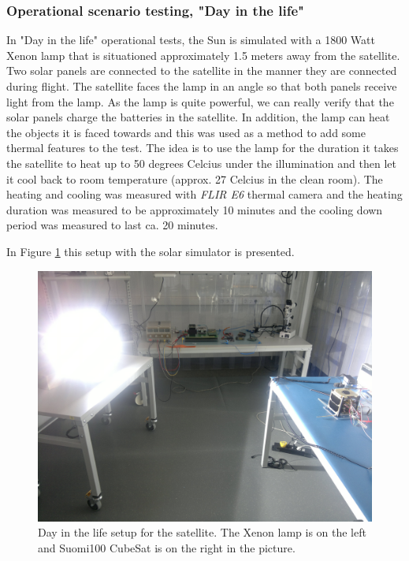 \documentclass[english,12pt,a4paper,pdftex,elec,utf8]{aaltothesis}
\begin{document}
\subsubsection{Operational scenario testing, "Day in the life"}
In "Day in the life" operational tests, the Sun is simulated with a %
1800 Watt Xenon lamp that is situationed approximately 1.5 meters away from the satellite. Two solar panels are connected to the satellite in the manner they are connected during flight. The satellite faces the lamp in an angle so that both panels receive light from the lamp. As the lamp is quite powerful, we can really verify that the solar panels charge the batteries in the satellite. In addition, the lamp can heat the objects it is faced towards and this was used as a method to add some thermal features to the test. The idea is to use the lamp for the duration it takes the satellite to heat up to 50 degrees Celcius under the illumination and then let it cool back to room temperature (approx. 27 Celcius in the clean room). The heating and cooling was measured with \textit{FLIR E6} thermal camera and the heating duration was measured to be approximately 10 minutes and the cooling down period was measured to last ca. 20 minutes.\par
In Figure \ref{dayinlife1} this setup with the solar simulator is presented.\par
\begin{figure}[h!]
\centering
\includegraphics[scale=0.3]{daysetuplamp2}
\caption{Day in the life setup for the satellite. The Xenon lamp is on the left and Suomi100 CubeSat is on the right in the picture.}
\label{dayinlife1}
\end{figure} 
\end{document}
